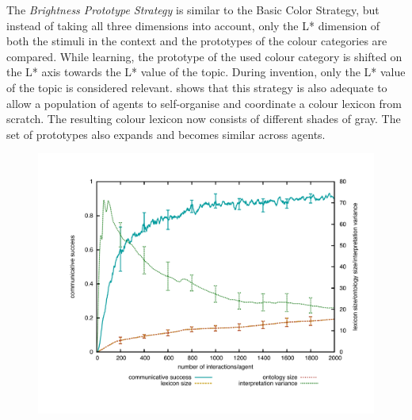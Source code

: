 The {\itshape Brightness Prototype Strategy} is similar to the Basic Color Strategy, but instead of taking all three dimensions into account, only the L* dimension of both the stimuli in the context and the prototypes of the colour categories are compared. While learning, the prototype of the used colour category is shifted on the L* axis towards the L* value of the topic. During invention, only the L* value of the topic is considered relevant.  shows that this strategy is also adequate to allow a population of agents to self-organise and coordinate a colour lexicon from scratch. The resulting colour lexicon now consists of different shades of gray. The set of prototypes also expands and becomes similar across agents. 

\begin{figure}[p]
\centerline{
\includegraphics[width=\textwidth]{chap12/figs/brightness-graph.pdf}
}


\end{figure}
